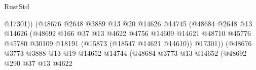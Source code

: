 \begin{lexlean}{RustStd}
\begin{coremodule}
                                                      @17301))
                                                  (@48676
                                                    @2648
                                                    @3889
                                                    @13
                                                    @20
                                                    @14626
                                                    @14745
                                                    (@48684
                                                      @2648
                                                      @13
                                                      @14626
                                                      (@48692
                                                        @166
                                                        @37
                                                        @13
                                                        @4622
                                                        @4756
                                                        @14609
                                                        @14621
                                                        @48710
                                                        @45776
                                                        @45780
                                                        @30109
                                                        @18191
                                                        (@15873 (@18547 @14621 @14610))
                                                        @17301))
                                                    (@48676
                                                      @3773
                                                      @3888
                                                      @13
                                                      @19
                                                      @14652
                                                      @14744
                                                      (@48684
                                                        @3773
                                                        @13
                                                        @14652
                                                        (@48692
                                                          @290
                                                          @37
                                                          @13
                                                          @4622

\end{coremodule}
\end{lexlean}
